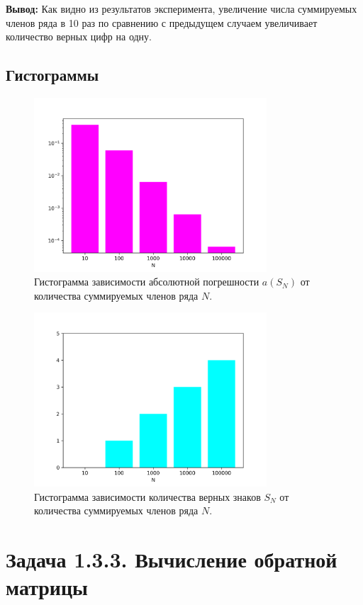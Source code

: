 \documentclass[12pt]{article}%
\begin{document}
\textbf{Вывод:} Как видно из результатов эксперимента, увеличение числа суммируемых членов ряда в 10 раз по сравнению с предыдущем случаем увеличивает количество верных цифр на одну. 


\subsection{Гистограммы}

\begin{figure}[!h]
    \centering
    \includegraphics[height=6.5cm]{series_abs_error.png}
    \caption{Гистограмма зависимости абсолютной погрешности $a(S_N)$ от количества суммируемых членов ряда $N$.}
    \label{fig:series_error}
\end{figure}
\newpage

\begin{figure}[!h]
    \centering
    \includegraphics[height=6.5cm]{series_num_digits.png}
    \caption{Гистограмма зависимости количества верных знаков $S_N$ от количества суммируемых членов ряда $N$.}
    \label{fig:series_digits}
\end{figure}
\newpage 


\newpage
\section{Задача 1.3.3. Вычисление обратной матрицы}
\end{document}
